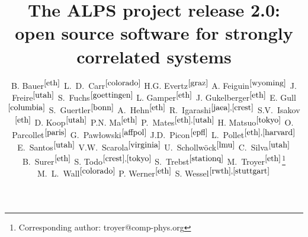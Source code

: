 \documentclass[12pt]{iopart}
\begin{document}
\title{The ALPS project release 2.0: \\ open source software for strongly correlated systems}


\newcommand{\myauthor}[3]{#2$^{#1}$}
\newcommand{\myaddress}[2]{\address{\refstepcounter{affiliation} $^{\arabic{affiliation}}$#2 \label{#1}}}

\author{
	\myauthor{\ref{eth}}{B. Bauer}{bauerb@phys.ethz.ch}
	\myauthor{\ref{colorado}}{L.~D.~Carr}{lcarr@mines.edu}
	\myauthor{\ref{graz}}{H.G. Evertz}{evertz@tugraz.at}
	\myauthor{\ref{wyoming}}{A. Feiguin}{afeiguin@uwyo.edu}
	\myauthor{\ref{utah}}{J. Freire}{juliana@cs.utah.edu}
	\myauthor{\ref{goettingen}}{S.~Fuchs}{fuchs@theorie.physik.uni-goettingen.de}
	\myauthor{\ref{eth}}{L. Gamper}{gamperl@gmail.com}
	\myauthor{\ref{eth}}{J. Gukelberger}{gukelberger@phys.ethz.ch}
	\myauthor{\ref{columbia}}{E. Gull}{gull@phys.columbia.edu}
	\myauthor{\ref{bonn}}{S.~Guertler}{guertler@th.physik.uni-bonn.de}
	\myauthor{\ref{eth}}{A.~Hehn}{hehn@phys.ethz.ch}
	\myauthor{\ref{jaea},\ref{crest}}{R.~Igarashi}{rigarash@hosi.phys.s.u-tokyo.ac.jp}
	\myauthor{\ref{eth}}{S.V.~Isakov}{isakov@phys.ethz.ch}
	\myauthor{\ref{utah}}{D. Koop}{dakoop@cs.utah.edu}
	\myauthor{\ref{eth}}{P.N. Ma}{pingnang@phys.ethz.ch}
	\myauthor{\ref{eth},\ref{utah}}{P.~Mates}{mates@sci.utah.edu}
	\myauthor{\ref{tokyo}}{H. Matsuo}{halm@looper.t.u-tokyo.ac.jp}
	\myauthor{\ref{paris}}{O. Parcollet}{parcolle@spht.saclay.cea.fr}
	\myauthor{\ref{affpol}}{G.~Paw{\l}owski}{gpawlo@amu.edu.pl}
	\myauthor{\ref{epfl}}{J.D.~Picon}{jean-david.picon@epfl.chl}
	\myauthor{\ref{eth},\ref{harvard}}{L.~Pollet}{pollet@phys.ethz.ch}
	\myauthor{\ref{utah}}{E.~Santos}{emanuele@sci.utah.edu}
	\myauthor{\ref{virginia}}{V.W.~Scarola}{scarola@vt.edu}
	\myauthor{\ref{lmu}}{U.~Schollw\"ock}{schollwoeck@lmu.de}
	\myauthor{\ref{utah}}{C.~Silva}{csilva@sci.utah.edu}
	\myauthor{\ref{eth}}{B.~Surer}{surerb@phys.ethz.ch}
	\myauthor{\ref{crest},\ref{tokyo}}{S. Todo}{wistaria@ap.t.u-tokyo.ac.jp}
	\myauthor{\ref{stationq}}{S.~Trebst}{trebst@kitp.ucsb.edu}
	\myauthor{\ref{eth}}{M.~Troyer}{troyer@ethz.ch}\footnote{Corresponding author: troyer@comp-phys.org}
	\myauthor{\ref{colorado}}{M.~L.~Wall}{mwall@mymail.mines.edu}
	\myauthor{\ref{eth}}{P. Werner}{werner@phys.ethz.ch}
	\myauthor{\ref{rwth},\ref{stuttgart}}{S. Wessel}{wessel@phys.ethz.ch}
}
\end{document}
